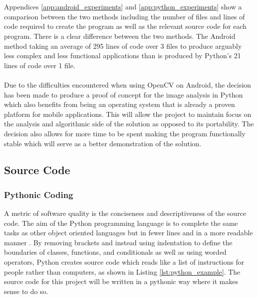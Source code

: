 		\\\\
		Appendices \ref{app:android_experiments} and \ref{app:python_experiments} show a comparison between the two methods including the number of files and lines of code required to create the program as well as the relevant source code for each program. There is a clear difference between the two methods. The Android method taking an average of 295 lines of code over 3 files to produce arguably less complex and less functional applications than is produced by Python’s 21 lines of code over 1 file.
		\\\\
		Due to the difficulties encountered when using OpenCV on Android, the decision has been made to produce a proof of concept for the image analysis in Python which also benefits from being an operating system that is already a proven platform for mobile applications. This will allow the project to maintain focus on the analysis and algorithmic side of the solution as opposed to its portability. The decision also allows for more time to be spent making the program functionally stable which will serve as a better demonstration of the solution.
	\subsection{Source Code}
		\subsubsection{Pythonic Coding}
			A metric of software quality is the conciseness and descriptiveness of the source code. The aim of the Python programming language is to complete the same tasks as other object oriented languages but in fewer lines and in a more readable manner \citep{kuhlman2009python}. By removing brackets and instead using indentation to define the boundaries of classes, functions, and conditionals as well as using worded operators, Python creates source code which reads like a list of instructions for people rather than computers, as shown in Listing \ref{lst:python_example}. The source code for this project will be written in a pythonic way where it makes sense to do so.
